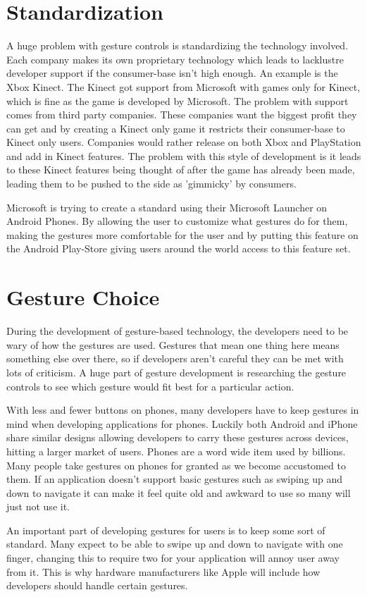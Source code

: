 \section{Standardization}
A huge problem with gesture controls is standardizing the technology involved. Each company makes its own proprietary technology which leads to lacklustre developer support if the consumer-base isn't high enough. An example is the Xbox Kinect. The Kinect got support from Microsoft with games only for Kinect, which is fine as the game is developed by Microsoft. The problem with support comes from third party companies. These companies want the biggest profit they can get and by creating a Kinect only game it restricts their consumer-base to Kinect only users. Companies would rather release on both Xbox and PlayStation and add in Kinect features. The problem with this style of development is it leads to these Kinect features being thought of after the game has already been made, leading them to be pushed to the side as 'gimmicky' by consumers.

Microsoft is trying to create a standard using their Microsoft Launcher on Android Phones. By allowing the user to customize what gestures do for them, making the gestures more comfortable for the user and by putting this feature on the Android Play-Store giving users around the world access to this feature set.

\section{Gesture Choice}
During the development of gesture-based technology, the developers need to be wary of how the gestures are used. Gestures that mean one thing here means something else over there, so if developers aren't careful they can be met with lots of criticism. A huge part of gesture development is researching the gesture controls to see which gesture would fit best for a particular action.

With less and fewer buttons on phones, many developers have to keep gestures in mind when developing applications for phones. Luckily both Android and iPhone share similar designs allowing developers to carry these gestures across devices, hitting a larger market of users. Phones are a word wide item used by billions. Many people take gestures on phones for granted as we become accustomed to them. If an application doesn't support basic gestures such as swiping up and down to navigate it can make it feel quite old and awkward to use so many will just not use it.

An important part of developing gestures for users is to keep some sort of standard. Many expect to be able to swipe up and down to navigate with one finger, changing this to require two for your application will annoy user away from it. This is why hardware manufacturers like Apple will include how developers should handle certain gestures. 